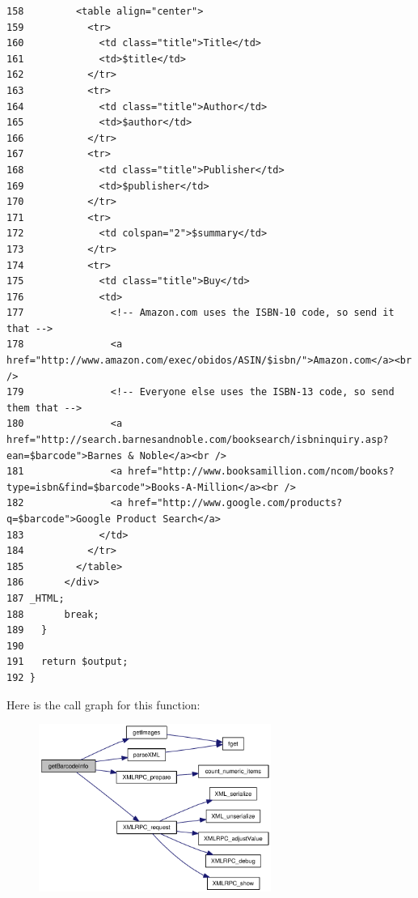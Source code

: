\begin{Code}
\begin{verbatim}
158         <table align="center">
159           <tr>
160             <td class="title">Title</td>
161             <td>$title</td>
162           </tr>
163           <tr>
164             <td class="title">Author</td>
165             <td>$author</td>
166           </tr>
167           <tr>
168             <td class="title">Publisher</td>
169             <td>$publisher</td>
170           </tr>
171           <tr>
172             <td colspan="2">$summary</td>
173           </tr>
174           <tr>
175             <td class="title">Buy</td>
176             <td>
177               <!-- Amazon.com uses the ISBN-10 code, so send it that -->
178               <a href="http://www.amazon.com/exec/obidos/ASIN/$isbn/">Amazon.com</a><br />
179               <!-- Everyone else uses the ISBN-13 code, so send them that -->
180               <a href="http://search.barnesandnoble.com/booksearch/isbninquiry.asp?ean=$barcode">Barnes & Noble</a><br />
181               <a href="http://www.booksamillion.com/ncom/books?type=isbn&find=$barcode">Books-A-Million</a><br />
182               <a href="http://www.google.com/products?q=$barcode">Google Product Search</a>
183             </td>
184           </tr>
185         </table>
186       </div>
187 _HTML;
188       break;
189   }
190 
191   return $output;
192 }\end{verbatim}
\end{Code}




Here is the call graph for this function:\nopagebreak
\begin{figure}[H]
\begin{center}
\leavevmode
\includegraphics[width=215pt]{barcode_8inc_e10c37e4f9f9b7c6617a388351a27c99_cgraph}
\end{center}
\end{figure}
